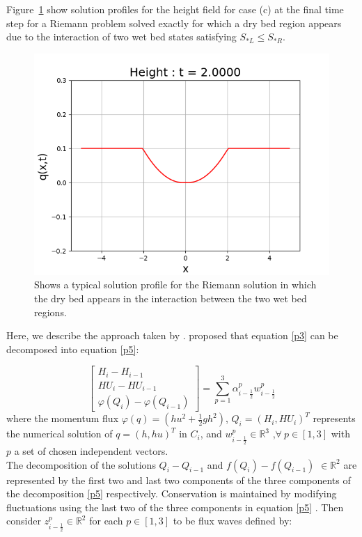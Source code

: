 \documentclass[11pt,a4paper]{article}
\begin{document}
	Figure~\ref{fig:middle} show solution profiles for the height field  for case (c) at the final time step for a Riemann problem  solved exactly for which a dry bed region appears due to the interaction of two wet bed states satisfying $S_{*L} \le S_{*R}$.
	\begin{figure}[H]
		\centering
		\includegraphics[width=0.8\linewidth]{images/middle}
		\caption{ Shows a typical solution profile for the Riemann solution in which the dry bed appears in the interaction between the two wet bed regions.}
		\label{fig:middle}
	\end{figure}
	
	
	Here, we describe the approach taken by  \citet{ge:2008}.  \citet{leveque2001class} proposed that equation \eqref{p3} can be decomposed into equation \eqref{p5}:
	
	\begin{equation}
		\begin{bmatrix} 
			H_{i} - H_{i-1}\\ 	HU_{i} - HU_{i-1} \\  \varphi(Q_{i}) - \varphi(Q_{i-1}) 
		\end{bmatrix} = \sum_{p=1}^{3} \alpha_{i-\frac{1}{2}}^{p} w_{i-\frac{1}{2}}^{p}
		\label{p5}
	\end{equation}
	where the momentum flux $\varphi(q) = (hu^{2} + \frac{1}{2} gh^{2})$, $Q_{i} = (H_{i},HU_{i})^{T}$ represents the numerical solution of $q = (h,hu)^{T}$ in $C_{i}$, and $w_{i-\frac{1}{2}}^{p} \in \mathbb{R}^{3}$ ,$\forall ~ p \in [1,3] $ with $p$ a set of chosen independent vectors. \\
	
	The decomposition of the solutions $Q_{i} - Q_{i-1} $  and  $f(Q_{i}) - f(Q_{i-1})$ $ \in  \mathbb{R}^{2}$ are represented by the first two and last two components of the three components of the decomposition \eqref{p5} respectively.  Conservation is maintained by modifying fluctuations using the last two of the three components  in equation \eqref{p5}  \cite{ba-le-mi-ro:2003}. Then  consider $z_{i-\frac{1}{2}}^{p} \in \mathbb{R}^{2}$ for each $p \in [1,3]$ to be flux waves defined by:
	
\end{document}
